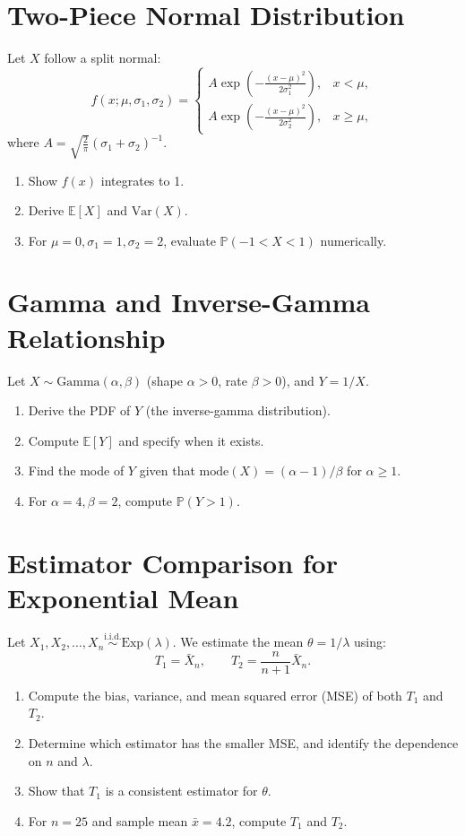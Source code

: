 \documentclass[12pt,a4paper]{article}
\begin{document}
\section{Two-Piece Normal Distribution}
Let \( X \) follow a split normal:
\[
f(x; \mu, \sigma_1, \sigma_2) =
\begin{cases}
A \exp\!\left(-\frac{(x-\mu)^2}{2\sigma_1^2}\right), & x < \mu,\\[0.5em]
A \exp\!\left(-\frac{(x-\mu)^2}{2\sigma_2^2}\right), & x \ge \mu,
\end{cases}
\]
where \( A = \sqrt{\tfrac{2}{\pi}}(\sigma_1 + \sigma_2)^{-1} \).
\begin{enumerate}[label=(\arabic*)]
\item Show \( f(x) \) integrates to 1.
\item Derive \( \mathbb{E}[X] \) and \( \mathrm{Var}(X) \).
\item For \( \mu=0,\sigma_1=1,\sigma_2=2 \), evaluate \( \mathbb{P}(-1<X<1) \) numerically.
\end{enumerate}

\section{Gamma and Inverse-Gamma Relationship}
Let \( X \sim \mathrm{Gamma}(\alpha,\beta) \) (shape \(\alpha>0\), rate \(\beta>0\)), and \( Y=1/X \).
\begin{enumerate}[label=(\arabic*)]
\item Derive the PDF of \( Y \) (the inverse-gamma distribution).
\item Compute \( \mathbb{E}[Y] \) and specify when it exists.
\item Find the mode of \( Y \) given that \( \mathrm{mode}(X) = (\alpha-1)/\beta \) for \( \alpha\ge1 \).
\item For \( \alpha=4,\beta=2 \), compute \( \mathbb{P}(Y>1) \).
\end{enumerate}


\section{Estimator Comparison for Exponential Mean}
Let \( X_1, X_2, \ldots, X_n \stackrel{\text{i.i.d.}}{\sim} \mathrm{Exp}(\lambda) \).
We estimate the mean \( \theta = 1/\lambda \) using:
\[
T_1 = \bar{X}_n, \qquad T_2 = \frac{n}{n+1}\bar{X}_n.
\]
\begin{enumerate}[label=(\arabic*)]
\item Compute the bias, variance, and mean squared error (MSE) of both \( T_1 \) and \( T_2 \).
\item Determine which estimator has the smaller MSE, and identify the dependence on \( n \) and \( \lambda \).
\item Show that \( T_1 \) is a consistent estimator for \( \theta \).
\item For \( n=25 \) and sample mean \( \bar{x}=4.2 \), compute \( T_1 \) and \( T_2 \).
\end{enumerate}
\end{document}
